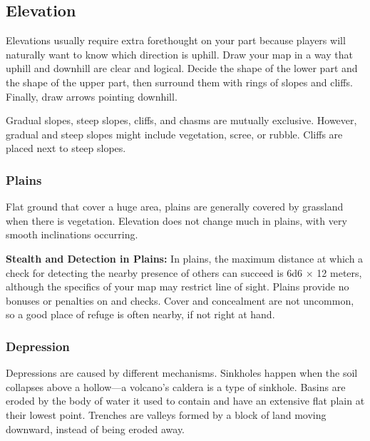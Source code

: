\subsection{Elevation}
Elevations usually require extra forethought on your part because players will naturally want to know which direction is uphill. Draw your map in a way that uphill and downhill are clear and logical. Decide the shape of the lower part and the shape of the upper part, then surround them with rings of slopes and cliffs. Finally, draw arrows pointing downhill.

Gradual slopes, steep slopes, cliffs, and chasms are mutually exclusive. However,
gradual and steep slopes might include vegetation, scree, or rubble. Cliffs are placed next to steep slopes.

\subsubsection{Plains}
Flat ground that cover a huge area, plains are generally covered by grassland when there is vegetation. Elevation does not change much in plains, with very smooth inclinations occurring.


\textbf{Stealth and Detection in Plains:} In plains, the maximum distance at which a  check for detecting the nearby presence of others can succeed is 6d6 $\times$ 12 meters, although the specifics of your map may restrict line of sight. Plains provide no bonuses or penalties on  and  checks. Cover and concealment are not uncommon, so a good place of refuge is often nearby, if not right at hand.

\subsubsection{Depression}
Depressions are caused by different mechanisms. Sinkholes happen when the soil collapses above a hollow---a volcano's caldera is a type of sinkhole. Basins are eroded by the body of water it used to contain and have an extensive flat plain at their lowest point. Trenches are valleys formed by a block of land moving downward, instead of being eroded away.


